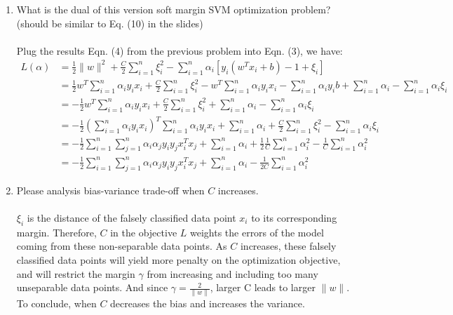 \documentclass[11pt]{article}
\begin{document}
\begin{enumerate}
	
	\item What is the dual of this version soft margin SVM optimization problem? (should be similar to Eq. (10) in the slides)\\ \\
	Plug the results Eqn. (4) from the previous problem into Eqn. (3), we have:
	\begin{equation}
		\begin{aligned}
			L(\alpha) &= \frac{1}{2}\|w\|^2 + \frac{C}{2}\sum_{i=1}^{n}\xi_i^2 - \sum_{i=1}^{n}\alpha_i[y_i(w^Tx_i+b)-1 + \xi_i]\\
			&= \frac{1}{2}w^T\sum_{i=1}^{n}\alpha_iy_ix_i + \frac{C}{2}\sum_{i=1}^{n}\xi_i^2 - w^T\sum_{i=1}^{n}\alpha_iy_ix_i - \sum_{i=1}^{n}\alpha_iy_ib + \sum_{i=1}^{n}\alpha_i - \sum_{i=1}^{n}\alpha_i\xi_i\\
			&= -\frac{1}{2}w^T\sum_{i=1}^{n}\alpha_iy_ix_i + \frac{C}{2}\sum_{i=1}^{n}\xi_i^2 + \sum_{i=1}^{n}\alpha_i - \sum_{i=1}^{n}\alpha_i\xi_i\\
			&= -\frac{1}{2}(\sum_{i=1}^{n}\alpha_iy_ix_i)^T\sum_{i=1}^{n}\alpha_iy_ix_i + \sum_{i=1}^{n}\alpha_i + \frac{C}{2}\sum_{i=1}^{n}\xi_i^2 - \sum_{i=1}^{n}\alpha_i\xi_i\\
			&= -\frac{1}{2}\sum_{i=1}^{n}\sum_{j=1}^{n}\alpha_i\alpha_jy_iy_jx_i^Tx_j + \sum_{i=1}^{n}\alpha_i + \frac{1}{2}\frac{1}{C}\sum_{i=1}^{n}\alpha_i^2 - \frac{1}{C}\sum_{i=1}^{n}\alpha_i^2 \\
			&= -\frac{1}{2}\sum_{i=1}^{n}\sum_{j=1}^{n}\alpha_i\alpha_jy_iy_jx_i^Tx_j + \sum_{i=1}^{n}\alpha_i - \frac{1}{2C}\sum_{i=1}^{n}\alpha_i^2
		\end{aligned}
	\end{equation}
	
	\item Please analysis bias-variance trade-off when $C$ increases.\\ \\
	$\xi_i$ is the distance of the falsely classified data point $x_i$ to its corresponding margin. Therefore, $C$ in the objective $L$ weights the errors of the model coming from these non-separable data points. As $C$ increases, these falsely classified data points will yield more penalty on the optimization objective, and will restrict the margin $\gamma$ from increasing and including too many unseparable data points. And since $\gamma=\frac{2}{\|w\|}$, larger C leads to larger $\|w\|$. To conclude, when $C$ decreases the bias and increases the variance.
	
\end{enumerate}
\end{document}
